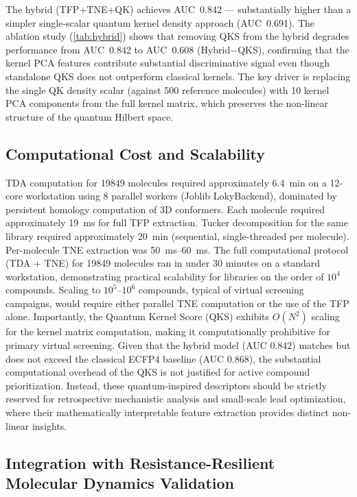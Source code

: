 \documentclass[11pt,a4paper]{article}
\begin{document}
The hybrid (TFP+TNE+QK) achieves AUC~0.842 --- substantially higher than a simpler single-scalar quantum kernel density approach (AUC~0.691). The ablation study (\cref{tab:hybrid}) shows that removing QKS from the hybrid degrades performance from AUC~0.842 to AUC~0.608 (Hybrid$-$QKS), confirming that the kernel PCA features contribute substantial discriminative signal even though standalone QKS does not outperform classical kernels. The key driver is replacing the single QK density scalar (against 500 reference molecules) with 10 kernel PCA components from the full kernel matrix, which preserves the non-linear structure of the quantum Hilbert space.

\subsection{Computational Cost and Scalability}

TDA computation for \num{19849} molecules required approximately \SI{6.4}{\minute} on a 12-core workstation using 8 parallel workers (Joblib LokyBackend), dominated by persistent homology computation of 3D conformers. Each molecule required approximately \SI{19}{\milli\second} for full TFP extraction. Tucker decomposition for the same library required approximately \SI{20}{\minute} (sequential, single-threaded per molecule). Per-molecule TNE extraction was \SIrange{50}{60}{\milli\second}. The full computational protocol (TDA + TNE) for \num{19849} molecules ran in under 30 minutes on a standard workstation, demonstrating practical scalability for libraries on the order of $10^4$ compounds. Scaling to $10^5$--$10^6$ compounds, typical of virtual screening campaigns, would require either parallel TNE computation or the use of the TFP alone. Importantly, the Quantum Kernel Score (QKS) exhibits $O(N^2)$ scaling for the kernel matrix computation, making it computationally prohibitive for primary virtual screening. Given that the hybrid model (AUC 0.842) matches but does not exceed the classical ECFP4 baseline (AUC 0.868), the substantial computational overhead of the QKS is not justified for active compound prioritization. Instead, these quantum-inspired descriptors should be strictly reserved for retrospective mechanistic analysis and small-scale lead optimization, where their mathematically interpretable feature extraction provides distinct non-linear insights.

\subsection{Integration with Resistance-Resilient Molecular Dynamics Validation}
\end{document}
